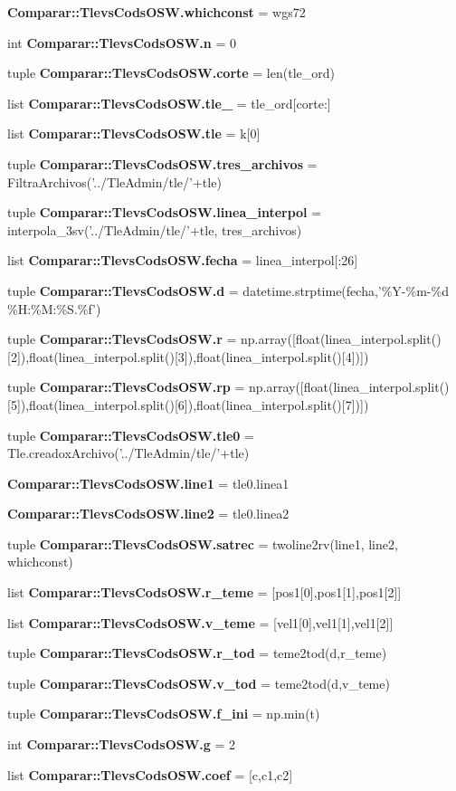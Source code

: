 \begin{DoxyCompactItemize}
\item 
{\bf \-Comparar\-::\-Tlevs\-Cods\-O\-S\-W.\-whichconst} = wgs72
\item 
int {\bf \-Comparar\-::\-Tlevs\-Cods\-O\-S\-W.\-n} = 0
\item 
tuple {\bf \-Comparar\-::\-Tlevs\-Cods\-O\-S\-W.\-corte} = len(tle\-\_\-ord)
\item 
list {\bf \-Comparar\-::\-Tlevs\-Cods\-O\-S\-W.\-tle\-\_} = tle\-\_\-ord[corte\-:]
\item 
list {\bf \-Comparar\-::\-Tlevs\-Cods\-O\-S\-W.\-tle} = k[0]
\item 
tuple {\bf \-Comparar\-::\-Tlevs\-Cods\-O\-S\-W.\-tres\-\_\-archivos} = \-Filtra\-Archivos('../\-Tle\-Admin/tle/'+tle)
\item 
tuple {\bf \-Comparar\-::\-Tlevs\-Cods\-O\-S\-W.\-linea\-\_\-interpol} = interpola\-\_\-3sv('../\-Tle\-Admin/tle/'+tle, tres\-\_\-archivos)
\item 
list {\bf \-Comparar\-::\-Tlevs\-Cods\-O\-S\-W.\-fecha} = linea\-\_\-interpol[\-:26]
\item 
tuple {\bf \-Comparar\-::\-Tlevs\-Cods\-O\-S\-W.\-d} = datetime.\-strptime(fecha,'\%\-Y-\/\%m-\/\%d \%\-H\-:\%\-M\-:\%\-S.\%f')
\item 
tuple {\bf \-Comparar\-::\-Tlevs\-Cods\-O\-S\-W.\-r} = np.\-array([float(linea\-\_\-interpol.\-split()[2]),float(linea\-\_\-interpol.\-split()[3]),float(linea\-\_\-interpol.\-split()[4])])
\item 
tuple {\bf \-Comparar\-::\-Tlevs\-Cods\-O\-S\-W.\-rp} = np.\-array([float(linea\-\_\-interpol.\-split()[5]),float(linea\-\_\-interpol.\-split()[6]),float(linea\-\_\-interpol.\-split()[7])])
\item 
tuple {\bf \-Comparar\-::\-Tlevs\-Cods\-O\-S\-W.\-tle0} = \-Tle.\-creadox\-Archivo('../\-Tle\-Admin/tle/'+tle)
\item 
{\bf \-Comparar\-::\-Tlevs\-Cods\-O\-S\-W.\-line1} = tle0.\-linea1
\item 
{\bf \-Comparar\-::\-Tlevs\-Cods\-O\-S\-W.\-line2} = tle0.\-linea2
\item 
tuple {\bf \-Comparar\-::\-Tlevs\-Cods\-O\-S\-W.\-satrec} = twoline2rv(line1, line2, whichconst)
\item 
list {\bf \-Comparar\-::\-Tlevs\-Cods\-O\-S\-W.\-r\-\_\-teme} = [pos1[0],pos1[1],pos1[2]]
\item 
list {\bf \-Comparar\-::\-Tlevs\-Cods\-O\-S\-W.\-v\-\_\-teme} = [vel1[0],vel1[1],vel1[2]]
\item 
tuple {\bf \-Comparar\-::\-Tlevs\-Cods\-O\-S\-W.\-r\-\_\-tod} = teme2tod(d,r\-\_\-teme)
\item 
tuple {\bf \-Comparar\-::\-Tlevs\-Cods\-O\-S\-W.\-v\-\_\-tod} = teme2tod(d,v\-\_\-teme)
\item 
tuple {\bf \-Comparar\-::\-Tlevs\-Cods\-O\-S\-W.\-f\-\_\-ini} = np.\-min(t)
\item 
int {\bf \-Comparar\-::\-Tlevs\-Cods\-O\-S\-W.\-g} = 2
\item 
list {\bf \-Comparar\-::\-Tlevs\-Cods\-O\-S\-W.\-coef} = [c,c1,c2]
\end{DoxyCompactItemize}
